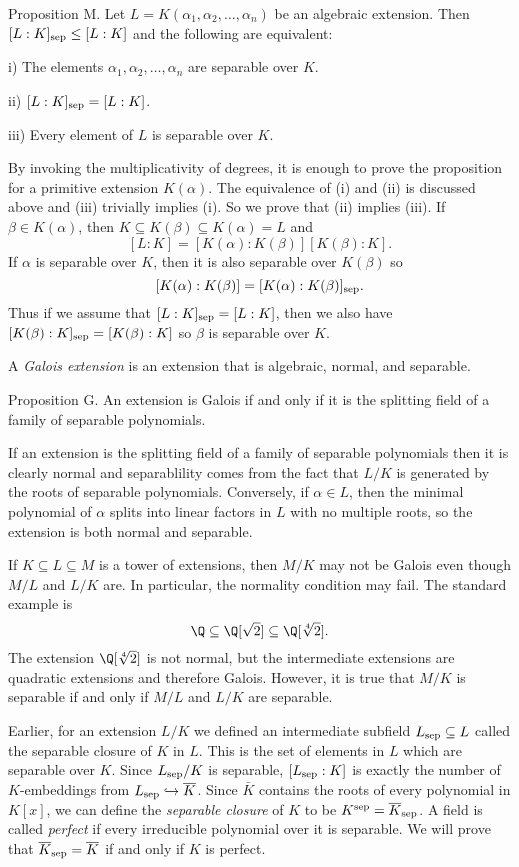 \proclaim Proposition M. Let $L = K(\alpha_1,\alpha_2,\ldots,\alpha_n)$ be an algebraic extension. Then $[L:K]_{{\rm sep}} \leq [L:K]$ and the following are equivalent:
\medskip
\item{i)} The elements $\alpha_1,\alpha_2,\ldots,\alpha_n$ are separable over $K$.
\smallskip
\item{ii)} $[L:K]_{{\rm sep}} = [L:K]$.
\smallskip
\item{iii)} Every element of $L$ is separable over $K$.
\medskip

\proof By invoking the multiplicativity of degrees, it is enough to prove the proposition for a primitive extension $K(\alpha)$. The equivalence of (i) and (ii) is discussed above and (iii) trivially implies (i). So we prove that (ii) implies (iii). If $\beta\in K(\alpha)$, then $K\subseteq K(\beta) \subseteq K(\alpha) = L$ and
$$[L:K] = [K(\alpha) : K(\beta)][K(\beta) : K].$$
If $\alpha$ is separable over $K$, then it is also separable over $K(\beta)$ so
$$[K(\alpha):K(\beta)] = [K(\alpha):K(\beta)]_{{\rm sep}}.$$
Thus if we assume that $[L:K]_{{\rm sep}} = [L:K]$, then we also have $[K(\beta) : K]_{{\rm sep}} = [K(\beta) : K]$ so $\beta$ is separable over $K$.\slug

A {\it Galois extension} is an extension that is algebraic, normal, and separable.

\proclaim Proposition G. An extension is Galois if and only if it is the splitting field of a family of separable polynomials.

\proof If an extension is the splitting field of a family of separable polynomials then it is clearly normal and separablility comes from the fact that $L/K$ is generated by the roots of separable polynomials. Conversely, if $\alpha\in L$, then the minimal polynomial of $\alpha$ splits into linear factors in $L$ with no multiple roots, so the extension is both normal and separable.\slug

If $K\subseteq L\subseteq M$ is a tower of extensions, then $M/K$ may not be Galois even though $M/L$ and $L/K$ are. In particular, the normality condition may fail. The standard example is
$$\Q \subseteq \Q[\sqrt 2] \subseteq \Q[\root 4\of 2].$$
The extension $\Q[\root 4\of 2]$ is not normal, but the intermediate extensions are quadratic extensions and therefore Galois. However, it is true that $M/K$ is separable if and only if $M/L$ and $L/K$ are separable.

Earlier, for an extension $L/K$ we defined an intermediate subfield $L_{\rm sep}\subseteq L$ called the separable closure of $K$ in $L$. This is the set of elements in $L$ which are separable over $K$. Since $L_{\rm sep}/K$ is separable, $[L_{\rm sep}:K]$ is exactly the number of $K$-embeddings from $L_{\rm sep}\hookrightarrow \overline K$. Since $\bar K$ contains the roots of every polynomial in $K[x]$, we can define the {\it separable closure} of $K$ to be $K^{\rm sep} = \overline K_{\rm sep}$. A field is called {\it perfect} if every irreducible polynomial over it is separable. We will prove that $\overline K_{\rm sep} = \overline K$ if and only if $K$ is perfect.

